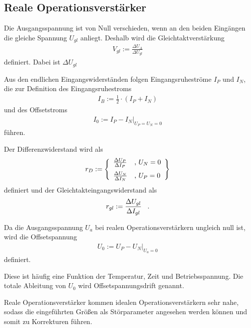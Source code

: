 \documentclass[]{scrartcl}
\begin{document}
\subsection{Reale Operationsverstärker}
Die Ausgangsspannung ist von Null verschieden, wenn an den beiden Eingängen die gleiche Spannung $U_{gl}$ anliegt. Deshalb wird die Gleichtaktverstärkung
\begin{align}
 V_{gl}:=\frac{\Delta U_{A}}{\Delta U_{gl}}
\end{align}
definiert. Dabei ist $\Delta U_{gl}$ 

Aus den endlichen Eingangswiderständen folgen Eingangsruheströme $I_{P}$ und $I_{N}$, die zur Definition des Eingangsruhestroms
\begin{align}
 I_{B}:=\frac{1}{2} \cdot \left(I_{P}+I_{N}\right)
\end{align}
und des Offsetstroms
\begin{align}
 I_{0}:= \left. I_{P}-I_{N}\right|_{U_{P}=U_{N}=0} 
\end{align}
führen.

Der Differenzwiderstand wird als
\begin{align}
 r_{D}:=\left\lbrace 
\begin{array}{ll}
\frac{\Delta U_{P}}{\Delta I_{P}} & \text{, }U_{N}=0 \vspace{0.2cm}\\
\frac{\Delta U_{N}}{\Delta I_{N}} & \text{, }U_{P}=0
\end{array}
\right\rbrace 
\end{align}
definiert und der Gleichtakteingangswiderstand als
\begin{align}
 r_{gl}:=\frac{\Delta U_{gl}}{\Delta I_{gl}} \hspace{0.3cm}\text{.}
\end{align}

Da die Ausgangsspannung $U_{a}$ bei realen Operationsverstärkern ungleich null ist, wird die Offsetspannung
\begin{align}
 U_0:=\left. U_{P}-U_{N} \right|_{U_{a}=0}
\end{align}
definiert.

Diese ist häufig eine Funktion der Temperatur, Zeit und Betriebsspannung. Die totale Ableitung von $U_{0}$ wird Offsetspannungsdrift genannt.

Reale Operationsverstärker kommen idealen Operationsverstärkern sehr nahe, sodass die eingeführten Größen als Störparameter angesehen werden können und somit zu Korrekturen führen.
\end{document}
